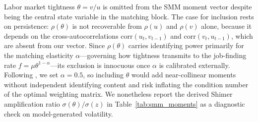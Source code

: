 
\begin{remark}
Labor market tightness $\theta = v/u$ is omitted from the SMM moment vector
despite being the central state variable in the matching block.
The case for inclusion rests on persistence: $\rho(\theta)$ is not recoverable
from $\rho(u)$ and $\rho(v)$ alone, because it depends on the
cross-autocorrelations $\mathrm{corr}(u_t, v_{t-1})$ and
$\mathrm{corr}(v_t, u_{t-1})$, which are absent from our vector.
Since $\rho(\theta)$ carries identifying power primarily for the matching
elasticity $\alpha$---governing how tightness transmits to the job-finding
rate $f = \mu \theta^{1-\alpha}$---its exclusion is innocuous once $\alpha$
is calibrated externally.
Following \citet{PetrongoloandPissarides2001}, we set $\alpha = 0.5$,
so including $\theta$ would add near-collinear moments without independent
identifying content and risk inflating the condition number of the optimal
weighting matrix.
We nonetheless report the derived Shimer amplification ratio
$\sigma(\theta)/\sigma(z)$ in Table~\ref{tab:smm_moments} as a
diagnostic check on model-generated volatility.
\end{remark}
